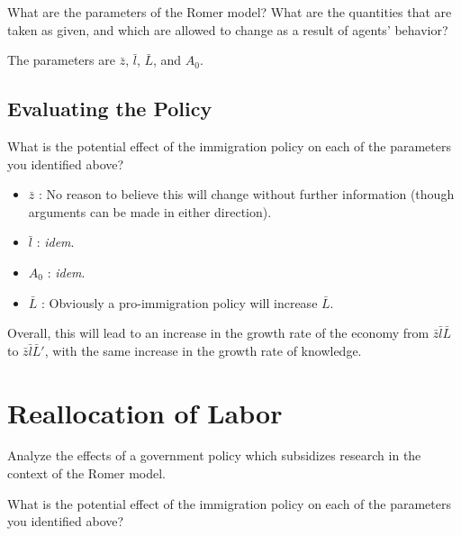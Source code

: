 \documentclass{article}
\newenvironment{solution}{\color{red}}{\color{black}}
\begin{document}
What are the parameters of the Romer model? What are the quantities that are taken as given, and which are allowed to change as a result of agents' behavior?


\begin{solution}
The parameters are $\bar{z}$, $\bar{l}$, $\bar{L}$, and $A_0$.
\end{solution}

\subsection*{Evaluating the Policy}

What is the potential effect of the immigration policy on each of the parameters you identified above?

\begin{solution}

\begin{itemize}
\item $\bar{z}$ : No reason to believe this will change without further information (though arguments can be made in either direction).
\item $\bar{l}$ : \textit{idem}.
\item $A_0$ : \textit{idem}.
\item $\bar{L}$ : Obviously a pro-immigration policy will increase $\bar{L}$.
\end{itemize}

Overall, this will lead to an increase in the growth rate of the economy from $\bar{z} \bar{l} \bar{L}$ to $\bar{z} \bar{l} \bar{L}'$, with the same increase in the growth rate of knowledge.

\end{solution}

\section{Reallocation of Labor}

Analyze the effects of a government policy which subsidizes research in the context of the Romer model.

What is the potential effect of the immigration policy on each of the parameters you identified above?
\end{document}
